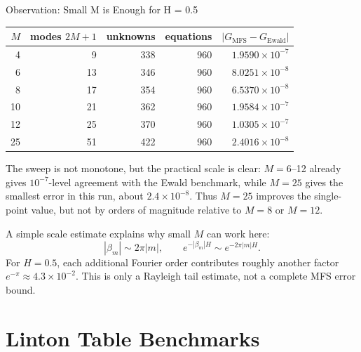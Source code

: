 \documentclass[aspectratio=169]{beamer}
\begin{document}
\begin{frame}{Observation: Small M is Enough for H = 0.5}
  \scriptsize
  \begin{center}
  \renewcommand{\arraystretch}{1.12}
  \begin{tabular}{rrrrr}
    \hline
    \(M\) & modes \(2M+1\) & unknowns & equations
      & \(|G_{\mathrm{MFS}}-G_{\mathrm{Ewald}}|\)\\
    \hline
    4  & 9  & 338 & 960 & \(1.9590{\times}10^{-7}\)\\
    6  & 13 & 346 & 960 & \(8.0251{\times}10^{-8}\)\\
    8  & 17 & 354 & 960 & \(6.5370{\times}10^{-8}\)\\
    10 & 21 & 362 & 960 & \(1.9584{\times}10^{-7}\)\\
    12 & 25 & 370 & 960 & \(1.0305{\times}10^{-7}\)\\
    25 & 51 & 422 & 960 & \(2.4016{\times}10^{-8}\)\\
    \hline
  \end{tabular}
  \end{center}

  \vspace{0.25em}
  The sweep is not monotone, but the practical scale is clear: \(M=6\)--12
  already gives \(10^{-7}\)-level agreement with the Ewald benchmark, while
  \(M=25\) gives the smallest error in this run, about \(2.4{\times}10^{-8}\).
  Thus \(M=25\) improves the single-point value, but not by orders of
  magnitude relative to \(M=8\) or \(M=12\).

  \vspace{0.25em}
  A simple scale estimate explains why small \(M\) can work here:
  \[
    |\beta_m|\sim 2\pi |m|,\qquad
    e^{-|\beta_m|H}\sim e^{-2\pi |m|H}.
  \]
  For \(H=0.5\), each additional Fourier order contributes roughly another
  factor \(e^{-\pi}\approx 4.3{\times}10^{-2}\).  This is only a Rayleigh
  tail estimate, not a complete MFS error bound.
\end{frame}

\section{Linton Table Benchmarks}
\end{document}
